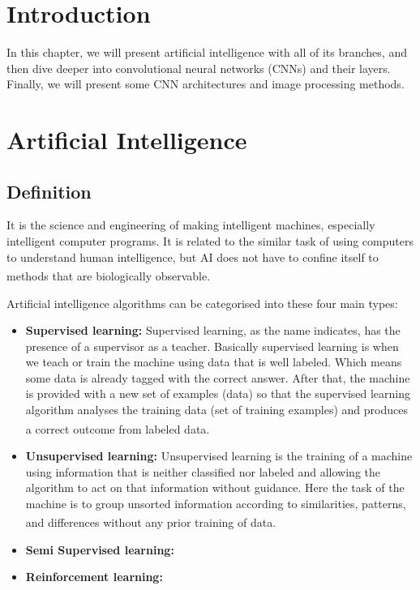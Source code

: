 \section{Introduction}
\vspace{0.2in}
\hspace*{0.16in}
In this chapter, we will present artificial intelligence with all of its branches, and then dive deeper into convolutional neural networks (CNNs) and their layers. Finally, we will present some CNN architectures and image processing methods.

\section{Artificial Intelligence}
\subsection{Definition}
It is the science and engineering of making intelligent machines, especially intelligent computer programs. It is related to the similar task of using computers to understand human intelligence, but AI does not have to confine itself to methods that are biologically observable. \textsuperscript{\cite{mccarthy2004artificial}}

Artificial intelligence algorithms can be categorised into these four main types:

\begin{itemize}
    \item \textbf{Supervised learning:}
        Supervised learning, as the name indicates, has the presence of a supervisor as a teacher. Basically supervised learning is when we teach or train the machine using data that is well labeled. Which means some data is already tagged with the correct answer. After that, the machine is provided with a new set of examples (data) so that the supervised learning algorithm analyses the training data (set of training examples) and produces a correct outcome from labeled data. \textsuperscript{\cite{AITypes-GeeksForGeeks}}
    \item \textbf{Unsupervised learning:}
        Unsupervised learning is the training of a machine using information that is neither classified nor labeled and allowing the algorithm to act on that information without guidance. Here the task of the machine is to group unsorted information according to similarities, patterns, and differences without any prior training of data. \textsuperscript{\cite{AITypes-GeeksForGeeks}}
    \item \textbf{Semi Supervised learning:}
    \item \textbf{Reinforcement learning:}
\end{itemize}

